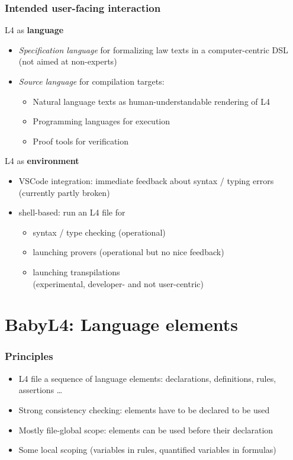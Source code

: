 \documentclass{beamer}
\begin{document}
\begin{frame}[fragile]\frametitle{Intended user-facing interaction}

  L4 as \textbf{language}
  \begin{itemize}
  \item \emph{Specification language} for formalizing law texts in a
    computer-centric DSL \\
    (not aimed at non-experts)
  \item \emph{Source language} for compilation targets:
    \begin{itemize}
    \item Natural language texts as human-understandable rendering of L4
    \item Programming languages for execution
    \item Proof tools for verification
    \end{itemize}
  \end{itemize}


  L4 as \textbf{environment}
  \begin{itemize}
  \item VSCode integration: immediate feedback about syntax / typing errors\\
    (currently partly broken)
  \item shell-based: run an L4 file for
    \begin{itemize}
    \item syntax / type checking (operational)
    \item launching  provers (operational but no nice feedback)
    \item launching transpilations\\
      (experimental, developer- and not user-centric)
    \end{itemize}
  \end{itemize}

\end{frame}


\section{BabyL4: Language elements}


\begin{frame}[fragile]\frametitle{Principles}

  \begin{itemize}
  \item L4 file a sequence of language elements: declarations, definitions,
    rules, assertions \dots
  \item Strong consistency checking: elements have to be declared to be used
  \item Mostly file-global scope: elements can be used before their
    declaration
  \item Some local scoping (variables in rules, quantified variables in
    formulas)
  \end{itemize}
  

\end{frame}
\end{document}
